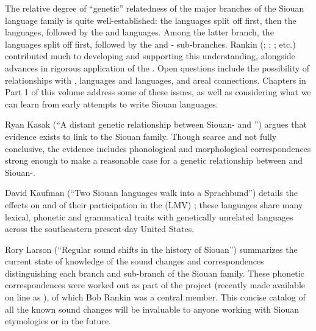 \begin{refsection}

The relative degree of ``genetic'' relatedness of the major branches of the Siouan language family is quite well-established: the  languages split off first, then the  languages, followed by the  and  languages. Among the latter branch, the  languages split off first, followed by the  and - sub-branches. Rankin (\citeyear{Rankin1988}; \citeyear{Rankin1998macrosiouan}; \citealt{RankinEtAl1998}; etc.) contributed much to developing and supporting this understanding, alongside advances in rigorous application of the . Open questions include the possibility of relationships with ,  languages and  languages, and areal connections. Chapters in Part 1 of this volume address some of these issues, as well as considering what we can learn from early attempts to write Siouan languages.

Ryan Kasak (``A distant genetic relationship between Siouan- and '') argues that evidence exists to link  to the Siouan family. Though scarce and not fully conclusive, the evidence includes phonological and morphological correspondences strong enough to make a reasonable case for a genetic relationship between  and Siouan-. 

David Kaufman (``Two Siouan languages walk into a Sprachbund'') details the effects on  and  of their participation in the  (LMV) ; these languages share many lexical, phonetic and grammatical traits with genetically unrelated languages across the southeastern present-day United States. 

Rory Larson (``Regular sound shifts in the history of Siouan'') summarizes the current state of knowledge of the sound changes and correspondences distinguishing each branch and sub-branch of the Siouan family. These phonetic correspondences were worked out as part of the  project (recently made available on line as \citet{Rankinetal2015AccessSeptember}), of which Bob Rankin was a central member. This concise catalog of all the known sound changes will be invaluable to anyone working with Siouan etymologies or  in the future.


\end{refsection}
